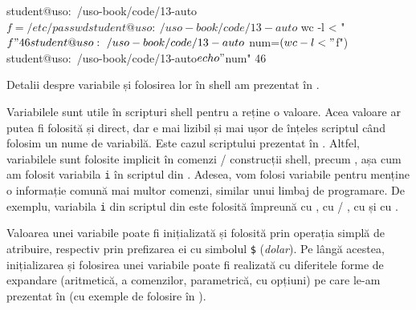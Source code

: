 \begin{screen}[caption={Folosirea variabilelor în shell},label={lst:auto:use-vars}]
student@uso:~/uso-book/code/13-auto$ f=/etc/passwd
student@uso:~/uso-book/code/13-auto$ wc -l < "$f"
46
student@uso:~/uso-book/code/13-auto$ num=$(wc -l < "$f")
student@uso:~/uso-book/code/13-auto$ echo "$num"
46
\end{screen}

Detalii despre variabile și folosirea lor în shell am prezentat în .

Variabilele sunt utile în scripturi shell pentru a reține o valoare.
Acea valoare ar putea fi folosită și direct, dar e mai lizibil și mai ușor de înțeles scriptul când folosim un nume de variabilă.
Este cazul scriptului  prezentat în .
Altfel, variabilele sunt folosite implicit în comenzi / construcții shell, precum , așa cum am folosit variabila \texttt{i} în scriptul  din .
Adesea, vom folosi variabile pentru menține o informație comună mai multor comenzi, similar unui limbaj de programare.
De exemplu, variabila \texttt{i} din scriptul  din  este folosită împreună cu , cu  / , cu  și cu .

Valoarea unei variabile poate fi inițializată și folosită prin operația simplă de atribuire, respectiv prin prefizarea ei cu simbolul \texttt{\$} (\textit{dolar}).
Pe lângă acestea, inițializarea și folosirea unei variabile poate fi realizată cu diferitele forme de expandare (aritmetică, a comenzilor, parametrică, cu opțiuni) pe care le-am prezentat în  (cu exemple de folosire în ).

